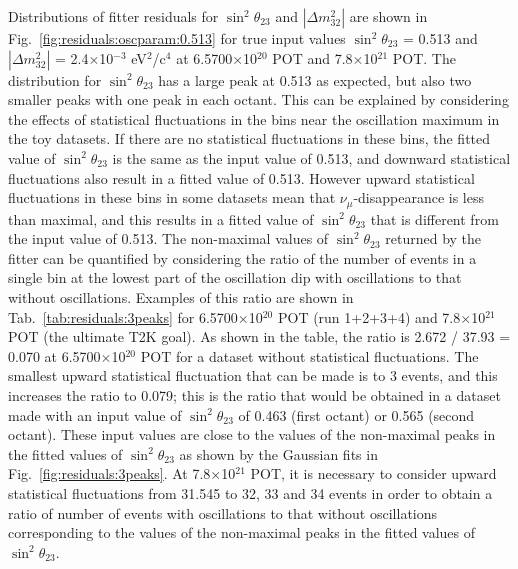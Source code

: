 Distributions of fitter residuals for $\sin^{2}\theta_{23}$ and $|\Delta m^{2}_{32}|$ are shown in
Fig.\ \ref{fig:residuals:oscparam:0.513}
for true input values $\sin^{2}\theta_{23}$ = 0.513 and $|\Delta m^{2}_{32}|$ = 2.4$\times$10$^{-3}$ eV$^{2}$/c$^{4}$
at 6.5700$\times$10$^{20}$ POT and 7.8$\times$10$^{21}$ POT.
The distribution for $\sin^{2}\theta_{23}$ has a large peak at 0.513 as expected, but also two smaller peaks with one peak in each octant. 
This can be explained by considering the effects of statistical fluctuations in the bins near the oscillation maximum in the toy datasets. 
If there are no statistical fluctuations in these bins, the fitted value of $\sin^{2}\theta_{23}$ is the same as the input value of 0.513, and 
downward statistical fluctuations also result in a fitted value of 0.513. However upward statistical fluctuations in these bins in some datasets mean 
that $\nu_{\mu}$-disappearance is less than maximal, and this results in a fitted value of $\sin^{2}\theta_{23}$ that is different 
from the input value of 0.513. 
The non-maximal values of $\sin^{2}\theta_{23}$ returned by the fitter can be quantified by considering the ratio of the number of events 
in a single bin at the lowest part of the oscillation dip with oscillations to that without oscillations. Examples of this ratio are shown 
in Tab.\ \ref{tab:residuals:3peaks} for 6.5700$\times$10$^{20}$ POT (run 1+2+3+4) and 7.8$\times$10$^{21}$ POT (the ultimate T2K goal). 
As shown in the table, the ratio is 2.672 / 37.93 = 0.070 at 6.5700$\times$10$^{20}$ POT for a dataset without statistical fluctuations. 
The smallest upward statistical fluctuation that can be made is to 3 events, and this increases the ratio to 0.079; this is the ratio that 
would be obtained in a dataset made with an input value of $\sin^{2}\theta_{23}$ of 0.463 (first octant) or 0.565 (second octant). These 
input values are close to the values of the non-maximal peaks in the fitted values of $\sin^{2}\theta_{23}$ as shown by the Gaussian fits in 
Fig.\ \ref{fig:residuals:3peaks}. At 7.8$\times$10$^{21}$ POT, it is necessary to consider upward statistical fluctuations from 31.545 to 
32, 33 and 34 events in order to obtain a ratio of number of events with oscillations to that without oscillations corresponding to the values 
of the non-maximal peaks in the fitted values of $\sin^{2}\theta_{23}$. 


